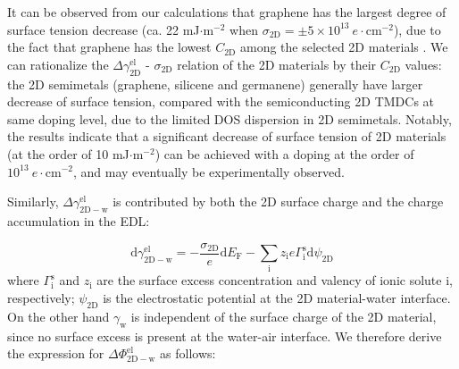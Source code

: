 \documentclass[journal=ancac3,manuscript=article,email=true]{achemso}
\begin{document}
It can be observed from our calculations that graphene has the largest
degree of surface tension decrease (ca. 22 mJ\(\cdot\mathrm{m}^{-2}\)
when \(\sigma_{\mathrm{2D}}=\pm5\times10^{13}\ e\cdot
\mathrm{cm}^{-2}\)), due to the fact that graphene has the lowest
\(C_{\mathrm{2D}}\) among the selected 2D materials
\cite{tian_multiscale_2016}. We can rationalize the \(\Delta
\gamma_{\mathrm{2D}}^{\mathrm{el}}\) - \(\sigma_{\mathrm{2D}}\) relation
of the 2D materials by their \(C_{\mathrm{2D}}\) values: the 2D
semimetals (graphene, silicene and germanene) generally have larger
decrease of surface tension, compared with the semiconducting 2D TMDCs
at same doping level, due to the limited DOS dispersion in 2D
semimetals. Notably, the results indicate that a significant decrease
of surface tension of 2D materials (at the order of 10 mJ\(\cdot
\mathrm{m}^{-2}\)) can be achieved with a doping at the order of
\(10^{13}\ e\cdot \mathrm{cm}^{-2}\), and may eventually be experimentally
observed.

Similarly, \(\Delta \gamma_{\mathrm{2D-w}}^{\mathrm{el}}\) is
contributed by both the 2D surface charge and the charge accumulation
in the EDL:

\begin{equation}
\label{eqn:dgamma-2D-w}
\mathrm{d}\gamma_{\mathrm{2D-w}}^{\mathrm{el}} = -\frac{\sigma_{\mathrm{2D}}}{e} \mathrm{d}E_{\mathrm{F}}
-\sum_{\mathrm{i}} z_{\mathrm{i}}e\Gamma_{\mathrm{i}}^{\mathrm{s}} \mathrm{d}\psi_{\mathrm{2D}}
\end{equation}
where \(\Gamma_{\mathrm{i}}^{\mathrm{s}}\) and \(z_{\mathrm{i}}\) are the
surface excess concentration and valency of ionic solute i,
respectively; \(\psi_{\mathrm{2D}}\) is the electrostatic potential at the 2D
material-water interface. On the other hand \(\gamma_{\mathrm{w}}\) is
independent of the surface charge of the 2D material, since no surface
excess is present at the water-air interface. We therefore derive
the expression for \(\Delta \Phi_{\mathrm{2D-w}}^{\mathrm{el}}\) as
follows:
\end{document}
